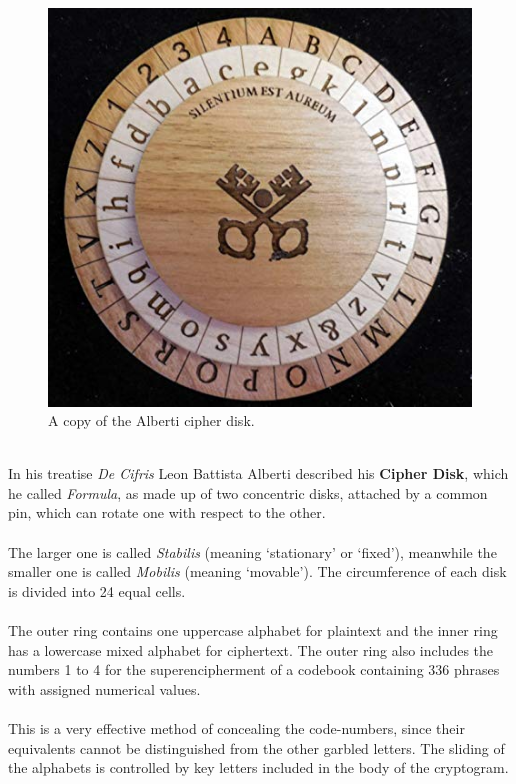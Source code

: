 \documentclass[Lau,binding=0.6cm,oneside]{sapthesis}
\begin{document}
\begin{figure}[H]
\includegraphics[scale=0.5]{alberti_cipher_disk}
\centering
\caption{A copy of the Alberti cipher disk.}
\centering
\end{figure}
\ \\
In his treatise \textit{De Cifris} Leon Battista Alberti described his \textbf{Cipher Disk}, which he called \textit{Formula}, as made up of two concentric disks, attached by a common pin, which can rotate one with respect to the other.\\\\
The larger one is called \textit{Stabilis} (meaning `stationary' or `fixed'), meanwhile the smaller one is called \textit{Mobilis} (meaning `movable'). The circumference of each disk is divided into 24 equal cells.\\\\
The outer ring contains one uppercase alphabet for plaintext and the inner ring has a lowercase mixed alphabet for ciphertext. The outer ring also includes the numbers 1 to 4 for the superencipherment of a codebook containing 336 phrases with assigned numerical values.\\\\
This is a very effective method of concealing the code-numbers, since their equivalents cannot be distinguished from the other garbled letters. The sliding of the alphabets is controlled by key letters included in the body of the cryptogram\supercite{alberti}.\\\\
\end{document}
